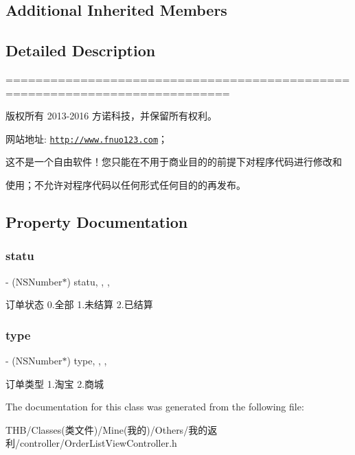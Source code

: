 \subsection*{Additional Inherited Members}


\subsection{Detailed Description}
============================================================================

版权所有 2013-\/2016 方诺科技，并保留所有权利。

网站地址\+: \href{http://www.fnuo123.com}{\tt http\+://www.\+fnuo123.\+com}； 



这不是一个自由软件！您只能在不用于商业目的的前提下对程序代码进行修改和

使用；不允许对程序代码以任何形式任何目的的再发布。 

 

\subsection{Property Documentation}
\mbox{\label{interface_order_list_view_controller_a129a65a182c09c55bbe60047ddb27eb9}} 
\subsubsection{\texorpdfstring{statu}{statu}}
{\footnotesize\ttfamily -\/ (N\+S\+Number$\ast$) statu\hspace{0.3cm}{\ttfamily [read]}, {\ttfamily [write]}, {\ttfamily [nonatomic]}, {\ttfamily [assign]}}

订单状态 0.全部 1.未结算 2.已结算 \mbox{\label{interface_order_list_view_controller_a40adcf2260d1819b4de7c2919c04685a}} 
\subsubsection{\texorpdfstring{type}{type}}
{\footnotesize\ttfamily -\/ (N\+S\+Number$\ast$) type\hspace{0.3cm}{\ttfamily [read]}, {\ttfamily [write]}, {\ttfamily [nonatomic]}, {\ttfamily [assign]}}

订单类型 1.淘宝 2.商城 

The documentation for this class was generated from the following file\+:\begin{DoxyCompactItemize}
\item 
T\+H\+B/\+Classes(类文件)/\+Mine(我的)/\+Others/我的返利/controller/Order\+List\+View\+Controller.\+h\end{DoxyCompactItemize}
